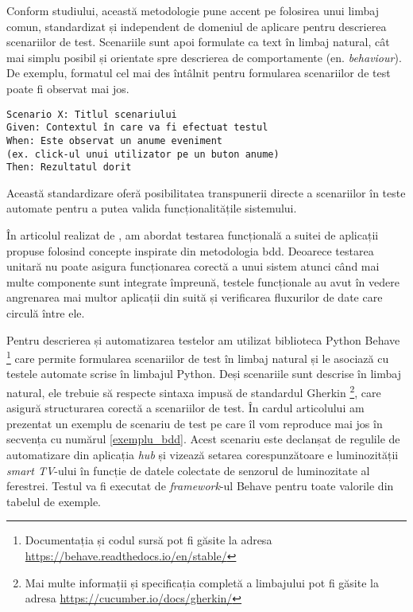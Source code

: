 Conform studiului, această metodologie pune accent pe folosirea unui limbaj comun, standardizat și independent de domeniul de aplicare pentru descrierea scenariilor de test. Scenariile sunt apoi formulate ca text în limbaj natural, cât mai simplu posibil și orientate spre descrierea de comportamente (en. \textit{behaviour}). De exemplu, formatul cel mai des întâlnit pentru formularea scenariilor de test poate fi observat mai jos.

\begin{lstlisting}[caption={Structură comună a unui scenariu de test folosind BDD}]
Scenario X: Titlul scenariului
Given: Contextul în care va fi efectuat testul
When: Este observat un anume eveniment 
(ex. click-ul unui utilizator pe un buton anume)
Then: Rezultatul dorit
\end{lstlisting}

Această standardizare oferă posibilitatea transpunerii directe a scenariilor în teste automate pentru a putea valida funcționalitățile sistemului.

În articolul realizat de \citet{Cristea2022}, am abordat testarea funcțională a suitei de aplicații propuse folosind concepte inspirate din metodologia \acrshort{bdd}. Deoarece testarea unitară nu poate asigura funcționarea corectă a unui sistem atunci când mai multe componente sunt integrate împreună, testele funcționale au avut în vedere angrenarea mai multor aplicații din suită și verificarea fluxurilor de date care circulă între ele.

Pentru descrierea și automatizarea testelor am utilizat biblioteca Python Behave \footnote{Documentația și codul sursă pot fi găsite la adresa \url{https://behave.readthedocs.io/en/stable/}} care permite formularea scenariilor de test în limbaj natural și le asociază cu testele automate scrise în limbajul Python. Deși scenariile sunt descrise în limbaj natural, ele trebuie să respecte sintaxa impusă de standardul Gherkin \footnote{Mai multe informații și specificația completă a limbajului pot fi găsite la adresa \url{https://cucumber.io/docs/gherkin/}}, care asigură structurarea corectă a scenariilor de test. În cardul articolului am prezentat un exemplu de scenariu de test pe care îl vom reproduce mai jos în secvența cu numărul \ref{exemplu_bdd}. Acest scenariu este declanșat de regulile de automatizare din aplicația \textit{hub} și vizează setarea corespunzătoare e luminozității \textit{smart TV}-ului în funcție de datele colectate de senzorul de luminozitate al ferestrei. Testul va fi executat de \textit{framework}-ul Behave pentru toate valorile din tabelul de exemple.

